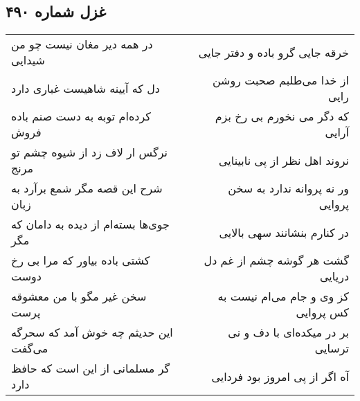\begin{center}
\section*{غزل شماره ۴۹۰}
\label{sec:sh490}
\begin{longtable}{l p{0.5cm} r}
در همه دیر مغان نیست چو من شیدایی
&&
خرقه جایی گرو باده و دفتر جایی
\\
دل که آیینه شاهیست غباری دارد
&&
از خدا می‌طلبم صحبت روشن رایی
\\
کرده‌ام توبه به دست صنم باده فروش
&&
که دگر می نخورم بی رخ بزم آرایی
\\
نرگس ار لاف زد از شیوه چشم تو مرنج
&&
نروند اهل نظر از پی نابینایی
\\
شرح این قصه مگر شمع برآرد به زبان
&&
ور نه پروانه ندارد به سخن پروایی
\\
جوی‌ها بسته‌ام از دیده به دامان که مگر
&&
در کنارم بنشانند سهی بالایی
\\
کشتی باده بیاور که مرا بی رخ دوست
&&
گشت هر گوشه چشم از غم دل دریایی
\\
سخن غیر مگو با من معشوقه پرست
&&
کز وی و جام می‌ام نیست به کس پروایی
\\
این حدیثم چه خوش آمد که سحرگه می‌گفت
&&
بر در میکده‌ای با دف و نی ترسایی
\\
گر مسلمانی از این است که حافظ دارد
&&
آه اگر از پی امروز بود فردایی
\\
\end{longtable}
\end{center}
